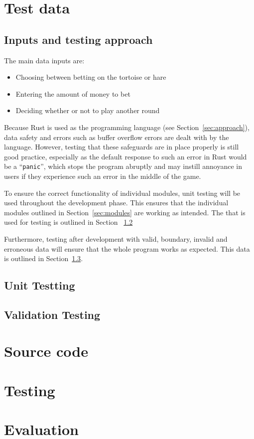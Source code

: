 \documentclass[11pt]{article}
\begin{document}
    \section{Test data}
    \subsection{Inputs and testing approach}
    The main data inputs are:
    \begin{itemize}
        \item Choosing between betting on the tortoise or hare
        \item Entering the amount of money to bet
        \item Deciding whether or not to play another round
    \end{itemize}

    Because Rust is used as the programming language (see Section~\ref{sec:approach}), data safety
    and errors such as buffer overflow errors are dealt with by the language. However, testing that
    these safeguards are in place properly is still good practice, especially as the default response
    to such an error in Rust would be a ``\texttt{panic}'', which stops the program abruptly and may
    instill annoyance in users if they experience such an error in the middle of the game.

    To ensure the correct functionality of individual modules, unit testing will be used throughout 
    the development phase. This ensures that the individual modules outlined in Section~\ref{sec:modules}
    are working as intended. The that is used for testing is outlined in Section ~\ref{sec:unit-test} 

    Furthermore, testing after development with valid, boundary, invalid and erroneous data will ensure 
    that the whole program works as expected. This data is outlined in Section~\ref{sec:whole-test}.
    \subsection{Unit Testting}
    \label{sec:unit-test}
    \subsection{Validation Testing}
    \label{sec:whole-test}
    \section{Source code}
    \section{Testing}
    \section{Evaluation}
\end{document}
